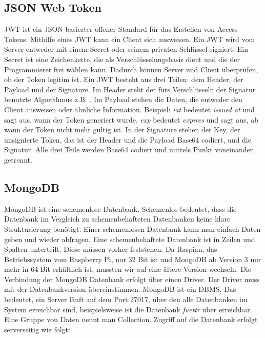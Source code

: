 \subsection{JSON Web Token}
\label{sec:vor-jwt}
\ac{JWT} ist ein JSON-basierter offener Standard für das Erstellen von Access Tokens. Mithilfe eines \ac{JWT} kann ein Client sich ausweisen. Ein \ac{JWT} wird vom Server entweder mit einem Secret oder seinem privaten Schlüssel signiert. Ein Secret ist eine Zeichenkette, die als Verschlüsselungsbasis dient und die der Programmierer frei wählen kann. Dadurch können Server und Client überprüfen, ob der Token legitim ist. Ein \ac{JWT} besteht aus drei Teilen: dem Header, der Payload und der Signature. Im Header steht der fürs Verschlüsseln der Signatur benutzte Algorithmus z.B: . Im Payload stehen die Daten, die entweder den Client ausweisen oder ähnliche Information. Beispiel:  \textit{iat} bedeutet \textit{issued at} und sagt aus, wann der Token generiert wurde. \textit{exp} bedeutet \textit{expires} und sagt aus, ab wann der Token nicht mehr gültig ist. In der Signature stehen der Key, der unsignierte Token, das ist der Header und die Payload Base64 codiert, und die Signatur. Alle drei Teile werden Base64 codiert und mittels Punkt voneinander getrennt.

\subsection{MongoDB}
\label{sec:vor-mongo}
MongoDB ist eine schemenlose Datenbank. Schemenlos bedeutet, dass die Datenbank im Vergleich zu schemenbehafteten Datenbanken keine klare Strukturierung benötigt. Einer schemenlosen Datenbank kann man einfach Daten geben und wieder abfragen. Eine schemenbehaftete Datenbank ist in Zeilen und Spalten unterteilt. Diese müssen vorher feststehen. Da Raspian, das Betriebssystem vom Raspberry Pi, nur 32 Bit ist und MongoDB ab Version 3 nur mehr in 64 Bit erhältlich ist, mussten wir auf eine ältere Version wechseln. Die Verbindung der MongoDB Datenbank erfolgt über einen Driver. Der Driver muss mit der Datenbankversion übereinstimmen. MongoDB ist ein \ac{DBMS}. Das bedeutet, ein Server läuft auf dem Port 27017, über den alle Datenbanken im System erreichbar sind, beispielsweise ist die Datenbank \textit{fuettr} über  erreichbar. Eine Gruppe von Daten nennt man Collection. Zugriff auf die Datenbank erfolgt serverseitig wie folgt:

